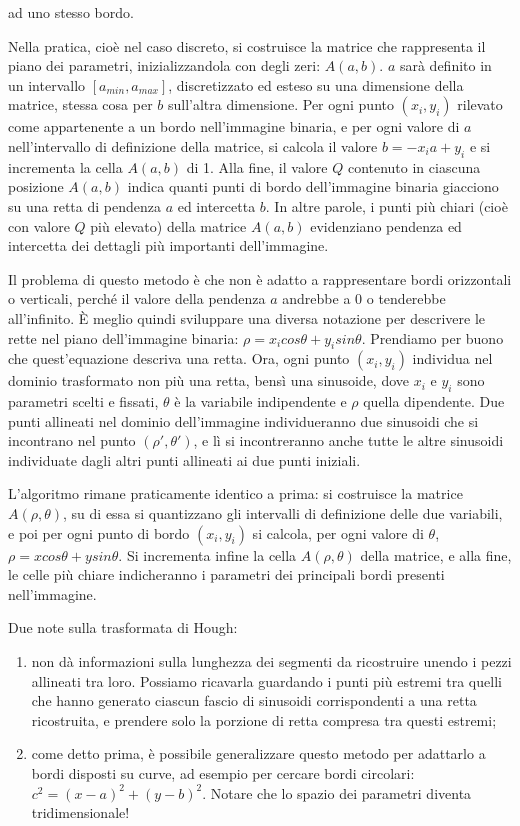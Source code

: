 \documentclass[a4paper,11pt]{article}
\begin{document}
ad uno stesso bordo.
\par
Nella pratica, cioè nel caso discreto, si costruisce la matrice che rappresenta il piano dei parametri, inizializzandola con degli zeri: $A(a,b)$.
$a$ sarà definito in un intervallo $[a_{min},a_{max}]$, discretizzato ed esteso su una dimensione della matrice, stessa cosa per $b$ sull'altra dimensione.
Per ogni punto $(x_i,y_i)$ rilevato come appartenente
a un bordo nell'immagine binaria, e per ogni valore di $a$ nell'intervallo di definizione della matrice, si calcola il valore $b = -x_i a + y_i$
e si incrementa la cella $A(a,b)$ di 1. Alla fine, il valore $Q$ contenuto in ciascuna posizione $A(a,b)$ indica quanti punti di bordo dell'immagine binaria
giacciono su una retta di pendenza $a$ ed intercetta $b$. In altre parole, i punti più chiari (cioè con valore $Q$ più elevato) della matrice $A(a,b)$ evidenziano
pendenza ed intercetta dei dettagli più importanti dell'immagine.
\par
Il problema di questo metodo è che non è adatto a rappresentare bordi orizzontali o verticali, perché il valore della pendenza $a$ andrebbe a 0 o tenderebbe
all'infinito. È meglio quindi sviluppare una diversa notazione per descrivere le rette nel piano dell'immagine binaria: $\rho = x_i cos\theta + y_i sin\theta$.
Prendiamo per buono che quest'equazione descriva una retta. Ora, ogni punto $(x_i,y_i)$ individua nel dominio trasformato non più una retta, bensì una
sinusoide, dove $x_i$ e $y_i$ sono parametri scelti e fissati, $\theta$ è la variabile indipendente e $\rho$ quella dipendente.
Due punti allineati nel dominio dell'immagine individueranno due sinusoidi che si incontrano nel punto $(\rho', \theta')$, e lì si incontreranno anche
tutte le altre sinusoidi individuate dagli altri punti allineati ai due punti iniziali.
\par
L'algoritmo rimane praticamente identico a prima: si costruisce la matrice $A(\rho,\theta)$, su di essa si quantizzano gli intervalli di definizione
delle due variabili, e poi per ogni punto di bordo $(x_i,y_i)$ si calcola, per ogni valore di $\theta$, $\rho = x cos\theta + y sin\theta$. Si incrementa infine
la cella $A(\rho,\theta)$ della matrice, e alla fine, le celle più chiare indicheranno i parametri dei principali bordi presenti nell'immagine.
\par
Due note sulla trasformata di Hough:
\begin{enumerate}
    \item non dà informazioni sulla lunghezza dei segmenti da ricostruire unendo i pezzi allineati tra loro. Possiamo ricavarla guardando i punti più estremi tra
    quelli che hanno generato ciascun fascio di sinusoidi corrispondenti a una retta ricostruita, e prendere solo la porzione di retta compresa tra questi estremi;
    \item come detto prima, è possibile generalizzare questo metodo per adattarlo a bordi disposti su curve, ad esempio per cercare bordi circolari: $c^2 = (x-a)^2
    + (y-b)^2$. Notare che lo spazio dei parametri diventa tridimensionale!
\end{enumerate}
\end{document}
